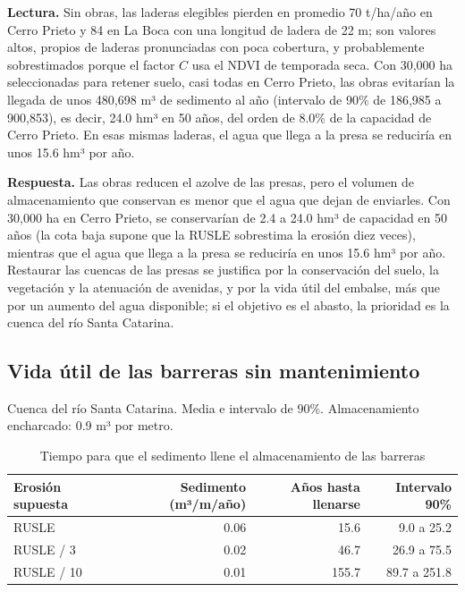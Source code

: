 \documentclass[11pt,letterpaper]{article}
\newcommand{\lectura}[1]{\par\noindent\textcolor{naranja}{\textbf{Lectura.}} #1\par}
\newcommand{\respuesta}[1]{\begin{cajarespuesta}\textbf{\color{naranja}Respuesta.} #1\end{cajarespuesta}}
\begin{document}
\lectura{Sin obras, las laderas elegibles pierden en promedio 70 t/ha/año en Cerro Prieto y 84 en La Boca con una longitud de ladera de 22 m; son valores altos, propios de laderas pronunciadas con poca cobertura, y probablemente sobrestimados porque el factor $C$ usa el NDVI de temporada seca. Con 30,000 ha seleccionadas para retener suelo, casi todas en Cerro Prieto, las obras evitarían la llegada de unos 480,698 m³ de sedimento al año (intervalo de 90\% de 186,985 a 900,853), es decir, 24.0 hm³ en 50 años, del orden de 8.0\% de la capacidad de Cerro Prieto. En esas mismas laderas, el agua que llega a la presa se reduciría en unos 15.6 hm³ por año.}

\respuesta{Las obras reducen el azolve de las presas, pero el volumen de almacenamiento que conservan es menor que el agua que dejan de enviarles. Con 30,000 ha en Cerro Prieto, se conservarían de 2.4 a 24.0 hm³ de capacidad en 50 años (la cota baja supone que la RUSLE sobrestima la erosión diez veces), mientras que el agua que llega a la presa se reduciría en unos 15.6 hm³ por año. Restaurar las cuencas de las presas se justifica por la conservación del suelo, la vegetación y la atenuación de avenidas, y por la vida útil del embalse, más que por un aumento del agua disponible; si el objetivo es el abasto, la prioridad es la cuenca del río Santa Catarina.}

\subsection{Vida útil de las barreras sin mantenimiento}\label{res:vidautil}

\begin{table}[H]\centering\small
\caption{Tiempo para que el sedimento llene el almacenamiento de las barreras}\label{tab:vidautil}
{\color{gris}Cuenca del río Santa Catarina. Media e intervalo de 90\%. Almacenamiento encharcado: 0.9 m³ por metro.\par}\smallskip
\begin{tabularx}{\linewidth}{Xrrr}
\toprule
Erosión supuesta & Sedimento (m³/m/año) & Años hasta llenarse & Intervalo 90\% \\
\midrule
RUSLE & 0.06 & 15.6 & 9.0 a 25.2 \\
RUSLE / 3 & 0.02 & 46.7 & 26.9 a 75.5 \\
RUSLE / 10 & 0.01 & 155.7 & 89.7 a 251.8 \\
\bottomrule
\end{tabularx}
\end{table}
\end{document}

